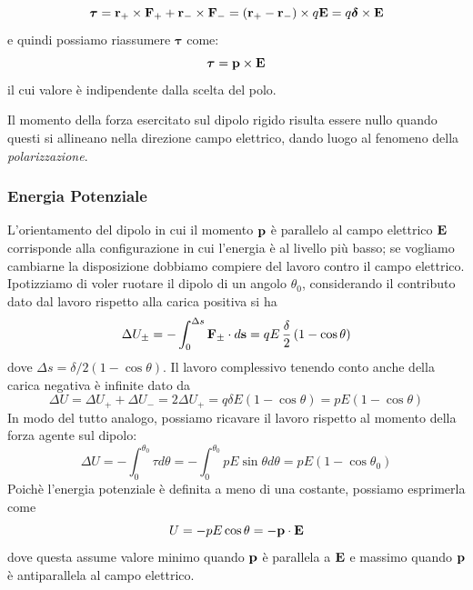 \begin{equation*}
	\bm{\tau} = \bold{r}_{+} \times \bold{F}_+ + \bold{r}_{-} \times \bold{F}_{-} = (\bold{r}_+ - \bold{r}_-) \times q\bold{E} = q \bm{\delta} \times \bold{E}
\end{equation*}
e quindi possiamo riassumere $\bm{\tau}$ come:
\begin{equation}
	\bm{\tau} = \bold{p} \times \bold{E}
\end{equation} 
il cui valore \`e indipendente dalla scelta del polo. 

Il momento della forza esercitato sul dipolo rigido risulta essere nullo quando questi si allineano nella direzione campo elettrico, dando luogo al fenomeno della \textit{polarizzazione}.
\begin{center}
\end{center}

\subsubsection{Energia Potenziale}

L'orientamento del dipolo in cui il momento $\bold{p}$ \`e parallelo al campo elettrico $\bold{E}$ corrisponde alla configurazione in cui l'energia \`e al livello pi\`u basso; se vogliamo cambiarne la disposizione dobbiamo compiere del lavoro contro il campo elettrico. Ipotizziamo di voler ruotare il dipolo di un angolo $\theta_0$, considerando il contributo dato dal lavoro rispetto alla carica positiva si ha
\begin{equation*}
\Delta U_{\pm} = - \int_0^{\Delta s} \bold{F}_{\pm} \cdot d\bold{s} = qE \, \frac{\delta}{2}\,(1- \cos \theta)
\end{equation*}
dove $\Delta s = \delta/2(1-\cos\theta)$. Il lavoro complessivo tenendo conto anche della carica negativa \`e infinite dato da 
\begin{equation*}
	\Delta U = \Delta U_+ + \Delta U_- = 2 \Delta U_+ = q \delta E(1-\cos\theta) = pE(1-\cos \theta)
\end{equation*}
In modo del tutto analogo, possiamo ricavare il lavoro rispetto al momento della forza agente sul dipolo:
\begin{equation*}
	\Delta U = - \int_0^{\theta_0} \tau d\theta  = - \int_0^{\theta_0} pE \sin\theta d\theta = pE(1-\cos \theta_0)
\end{equation*}
Poich\`e l'energia potenziale \`e definita a meno di una costante, possiamo esprimerla come 
\begin{equation}
	U = -pE \cos\theta = - \bold{p} \cdot \bold{E}
\end{equation} 
dove questa assume valore minimo quando $\bold{p}$ \`e parallela a $\bold{E}$ e massimo quando $\bold{p}$ \`e antiparallela al campo elettrico.

